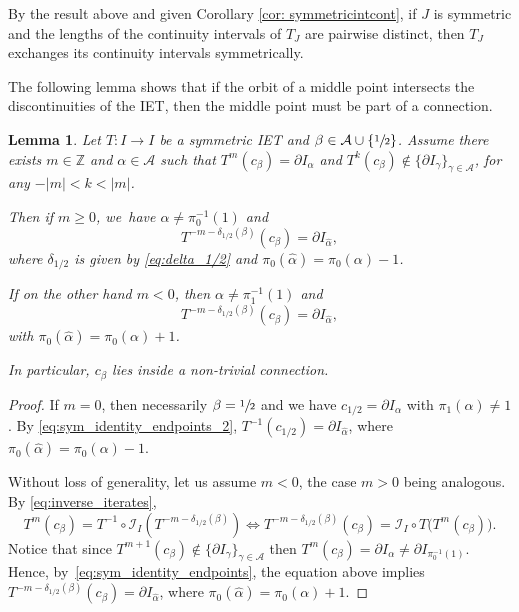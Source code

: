 \documentclass[10pt,a4paper]{amsart}
\theoremstyle{plain}
\newtheorem{lemma}[theorem]{Lemma}
\theoremstyle{definition}
\newcommand{\A}{\mathcal{A}}
\newcommand{\I}{\mathcal{I}}
\newcommand{\Z}{\mathbb{Z}}
\begin{document}
By the result above and given Corollary \ref{cor: symmetricintcont}, if $J$ is symmetric and the lengths of the continuity intervals of $T_J$ are pairwise distinct, then $T_J$ exchanges its continuity intervals symmetrically.

The following lemma shows that if the orbit of a middle point intersects the discontinuities of the IET, then the middle point must be part of a connection.

\begin{lemma}
\label{lem:symmetric_connection}
Let $T: I \to I$ be a symmetric IET and $\beta \in \A \cup \{\sfrac{1}{2}\}$. Assume there exists $m \in \Z$ and $\alpha \in \A$ such that $T^m(c_\beta) = \partial I_\alpha$ and $T^k(c_\beta) \notin \{\partial I_\gamma\}_{\gamma \in \A}$, for any $-|m| < k < |m|$.

Then {if $m\ge 0$}, we~have $\alpha \neq \pi_0^{-1}(1)$ and\vspace*{-3pt}
\[
T^{-m - \delta_{1/2}(\beta)}(c_\beta) = \partial I_{\hat \alpha},
\]
where $\delta_{1/2}$ is given by \eqref{eq:delta_1/2} and $\pi_0( \hat \alpha) = \pi_0(\alpha) - 1$.

{If on the other hand $m<0$, then $\alpha\neq \pi_1^{-1}(1)$ and\vspace*{-3pt}
\[
T^{-m - \delta_{1/2}(\beta)}(c_\beta) = \partial I_{\hat \alpha},
\]
with $\pi_0( \hat \alpha) = \pi_0(\alpha) + 1$.
}

In particular, $c_\beta$ lies inside a non-trivial connection.
\end{lemma}

\begin{proof}

If $m = 0$, then necessarily $\beta = \sfrac{1}{2}$ and we have $c_{1/2} = \partial I_\alpha$ with $\pi_1(\alpha) \neq 1$. By \eqref{eq:sym_identity_endpoints_2}, $T^{-1}(c_{1/2}) = \partial I_{\hat \alpha}$, where $\pi_0( \hat \alpha) = \pi_0(\alpha) - 1$.

Without loss of generality, let us assume $m < 0$, the case $m > 0$ being analogous. By \eqref{eq:inverse_iterates},
\begin{equation*}
\label{eq:inverse_iterates_negative}
T^m(c_{\beta})=T^{-1}\circ \I_I(T^{-m-\delta_{1/2}(\beta)})\iff T^{-m- \delta_{1/2}(\beta) }(c_\beta) = \I_I\circ T \big( T^{m}(c_\beta)\big).
\end{equation*}
Notice that since $T^{m + 1}(c_\beta) \notin \{\partial I_\gamma\}_{\gamma \in \A}$ then $T^{m}(c_\beta) = \partial I_\alpha \neq \partial I_{\pi_0^{-1}(1)}$. Hence, by~\eqref{eq:sym_identity_endpoints}, the equation above implies $T^{-m - \delta_{1/2}(\beta)}(c_\beta) = \partial I_{\hat \alpha}$, where \hbox{$\pi_0( \hat \alpha) = \pi_0(\alpha) + 1$}.
\end{proof}
\end{document}
